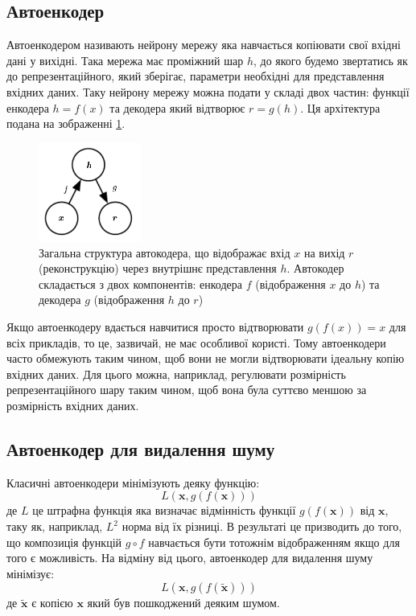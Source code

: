\documentclass[14pt,a4paper]{extarticle}
\newcounter{e}
\numberwithin{equation}{section}
\numberwithin{figure}{section}
\begin{document}
	\subsection{Автоенкодер}
	
	Автоенкодером називають нейрону мережу яка навчається копіювати свої вхідні дані у вихідні. Така мережа має проміжний шар $h$, до якого будемо звертатись як до репрезентаційного, який зберігає, параметри необхідні для представлення вхідних даних. Таку нейрону мережу можна подати у складі двох частин: функції енкодера $h = f(x)$ та декодера який відтворює $r = g(h)$. Ця архітектура подана на зображенні \ref*{fig:autoencoder-graph}.
	\begin{figure}[H]
		\centering
		\includegraphics[width=0.3\textwidth]{../resources/autoencoder-graph.png}
		\caption{Загальна структура автокодера, що відображає вхід $x$ на вихід $r$ (реконструкцію) через внутрішнє представлення $h$. Автокодер складається з двох компонентів: енкодера $f$ (відображення $x$ до $h$) та декодера $g$ (відображення $h$ до $r$) \cite{Goodfellow-et-al-2016}} 
		\label{fig:autoencoder-graph}
	\end{figure}
	Якщо автоенкодеру вдається навчитися просто відтворювати $g(f(x)) = x$ для всіх прикладів, то це, зазвичай, не має особливої користі. Тому автоенкодери часто обмежують таким чином, щоб вони не могли відтворювати ідеальну копію вхідних даних. Для цього можна, наприклад, регулювати розмірність репрезентаційного шару таким чином, щоб вона була суттєво меншою за розмірність вхідних даних.
	
	\newpage
	\subsection{Автоенкодер для видалення шуму}
	Класичні автоенкодери мінімізують деяку функцію:
	\begin{equation}
		L(\boldsymbol{x}, g(f(\boldsymbol{x})))
	\end{equation}
	де $L$ це штрафна функція яка визначає відмінність функції $g(f(\boldsymbol{x}))$ від $\boldsymbol{x}$, таку як, наприклад,  $L^{2}$ норма від їх різниці. В результаті це призводить до того, що композиція функцій $g \circ f$ навчається бути тотожнім відображенням якщо для того є можливість. На відміну від цього, автоенкодер для видалення шуму мінімізує:
	\begin{equation}
		L(\boldsymbol{x}, g(f(\tilde{\boldsymbol{x}})))
	\end{equation}
	де $\tilde{\boldsymbol{x}}$ є копією $\boldsymbol{x}$ який був пошкоджений деяким шумом. 
		
\end{document}
